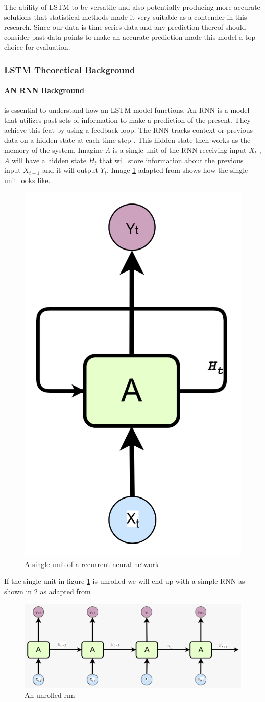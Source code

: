  The ability of LSTM to be versatile and also potentially producing more accurate solutions that statistical methods made it very suitable as a contender in this research. Since our data is time series data and any prediction thereof should consider past data points to make an accurate prediction made this model a top choice for evaluation.
 
\subsubsection{LSTM Theoretical Background \label{sec:lstm_background}}
 
\paragraph{AN RNN Background} is essential to understand how an LSTM model functions. An RNN is a model that utilizes past sets of information to make a prediction of the present. They achieve this feat by using a feedback loop. The RNN tracks context or previous data on a hidden state at each time step \cite{stryker_ibm_rnn}. This hidden state then works as the memory of the system. 
Imagine \textit{A} is a single unit of the RNN receiving input \textit{$X_t$} , \textit{A} will have a  hidden state \textit{$H_t$} that will store information about the previous input $X_{t-1}$ and it will output \textit{$Y_t$}. Image \ref{fig:rnnsingleunit} adapted from \cite{colah2015understanding} shows how the single unit looks like.

\begin{figure}[h]
	\centering
	\includegraphics[width=0.1\linewidth]{Chapters/images/rnn_singleunit}
	\caption{A single unit of a recurrent neural network}
	\label{fig:rnnsingleunit}
\end{figure}
If the single unit in figure \ref{fig:rnnsingleunit} is unrolled we will end up with a simple RNN as shown in \ref{fig:unrolledrnn} as adapted from \cite{colah2015understanding}.


\begin{figure}[h]
	\centering
	\includegraphics[width=0.8\linewidth]{Chapters/images/unrolled_rnn.jpeg}
	\caption{An unrolled rnn}
	\label{fig:unrolledrnn}
\end{figure}

